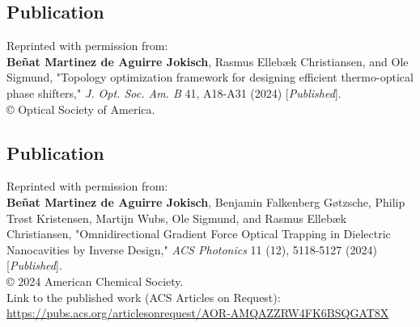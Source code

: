 \vspace*{0.4\textheight}
\begin{center}
  \begin{minipage}{0.9\linewidth}
    \section*{Publication \cite{ownpub0}}

    Reprinted with permission from:\\ 

    \textbf{Beñat Martinez de Aguirre Jokisch}, Rasmus Ellebæk Christiansen, and Ole Sigmund, "Topology optimization framework for designing efficient thermo-optical phase shifters," \textit{J. Opt. Soc. Am. B} 41, A18-A31 (2024) [\textit{Published}]. \\
  
    © Optical Society of America.

  \end{minipage}
\end{center}
\newpage


\vspace*{0.4\textheight}
\begin{center}
  \begin{minipage}{0.9\linewidth}
    \section*{Publication \cite{ownpub1}}

    Reprinted with permission from:\\ 

    \textbf{Beñat Martinez de Aguirre Jokisch}, Benjamin Falkenberg Gøtzsche, Philip Trøst Kristensen, Martijn Wubs, Ole Sigmund, and Rasmus Ellebæk Christiansen, "Omnidirectional Gradient Force Optical Trapping in Dielectric Nanocavities by Inverse Design," \textit{ACS Photonics} 11 (12), 5118-5127 (2024) [\textit{Published}]. \\

    © 2024 American Chemical Society.\\

    Link to the published work (ACS Articles on Request):\\
     \url{https://pubs.acs.org/articlesonrequest/AOR-AMQAZZRW4FK6BSQGAT8X}
  \end{minipage}
\end{center}
\newpage


